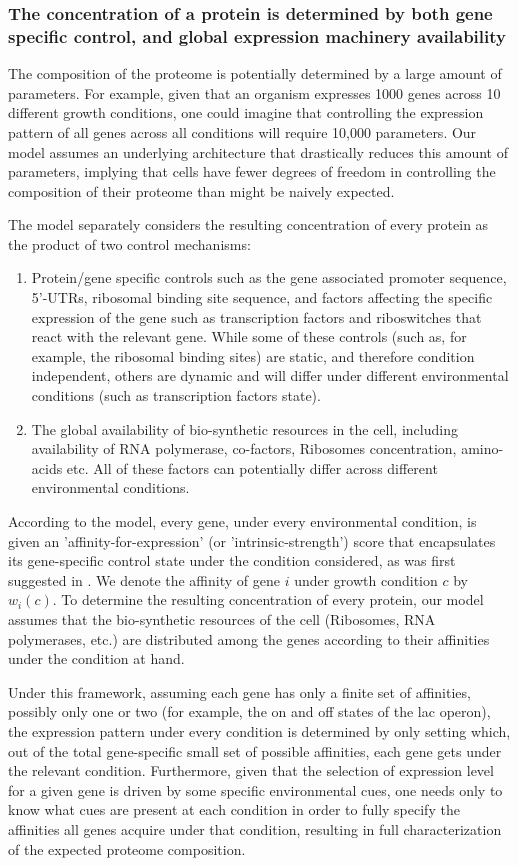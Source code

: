 \subsubsection{The concentration of a protein is determined by both gene specific control, and global
expression machinery availability}
The composition of the proteome is potentially determined by a large amount of parameters.
For example, given that an organism expresses 1000 genes across 10 different growth conditions, one could imagine that controlling the expression pattern of all genes across all conditions will require 10,000 parameters.
Our model assumes an underlying architecture that drastically reduces this amount of parameters, implying that cells have fewer degrees of freedom in controlling the composition of their proteome than might be naively expected.

The model separately considers the resulting concentration of every protein as the product of two control mechanisms:
\begin{enumerate}
\item Protein/gene specific controls such as the gene associated promoter sequence, 5'-UTRs, ribosomal binding site sequence, and factors affecting the specific expression of the gene such as transcription factors and riboswitches that react with the relevant gene.
  While some of these controls (such as, for example, the ribosomal binding sites) are static, and therefore condition independent, others are dynamic and will differ under different environmental conditions (such as transcription factors state).
\item The global availability of bio-synthetic resources in the cell, including availability of RNA polymerase, co-factors, Ribosomes concentration, amino-acids etc.
  All of these factors can potentially differ across different environmental conditions.
\end{enumerate}


According to the model, every gene, under every environmental condition, is given an 'affinity-for-expression' (or 'intrinsic-strength') score that encapsulates its gene-specific control state under the condition considered, as was first suggested in \cite{Maaloe1969}.
We denote the affinity of gene $i$ under growth condition $c$ by $w_i(c)$.
To determine the resulting concentration of every protein, our model assumes that the bio-synthetic resources of the cell (Ribosomes, RNA polymerases, etc.) are distributed among the genes according to their affinities under the condition at hand.

Under this framework, assuming each gene has only a finite set of affinities, possibly only one or two (for example, the on and off states of the lac operon), the expression pattern under every condition is determined by only setting which, out of the total gene-specific small set of possible affinities, each gene gets under the relevant condition.
Furthermore, given that the selection of expression level for a given gene is driven by some specific environmental cues, one needs only to know what cues are present at each condition in order to fully specify the affinities all genes acquire under that condition, resulting in full characterization of the expected proteome composition.

